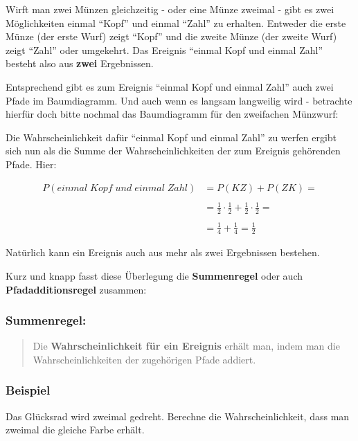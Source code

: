\documentclass[
  ngerman,
]{book}
\begin{document}
Wirft man zwei Münzen gleichzeitig - oder eine Münze zweimal - gibt es zwei Möglichkeiten einmal ``Kopf'' und einmal ``Zahl'' zu erhalten. Entweder die erste Münze (der erste Wurf) zeigt ``Kopf'' und die zweite Münze (der zweite Wurf) zeigt ``Zahl'' oder umgekehrt. Das Ereignis ``einmal Kopf und einmal Zahl'' besteht also aus \textbf{zwei} Ergebnissen.

Entsprechend gibt es zum Ereignis ``einmal Kopf und einmal Zahl'' auch zwei Pfade im Baumdiagramm. Und auch wenn es langsam langweilig wird - betrachte hierfür doch bitte nochmal das Baumdiagramm für den zweifachen Münzwurf:

Die Wahrscheinlichkeit dafür ``einmal Kopf und einmal Zahl'' zu werfen ergibt sich nun als die Summe der Wahrscheinlichkeiten der zum Ereignis gehörenden Pfade. Hier:

\[\begin{align} P(einmal\;Kopf\;und\;einmal\;Zahl) &= P(KZ) + P(ZK) =\\
{}\\
&= \frac{1}{2} \cdot \frac{1}{2} + \frac{1}{2} \cdot \frac{1}{2} =\\
{}\\
&= \frac{1}{4} + \frac{1}{4} = \frac{1}{2} \end{align}\]

Natürlich kann ein Ereignis auch aus mehr als zwei Ergebnissen bestehen.

Kurz und knapp fasst diese Überlegung die \textbf{Summenregel} oder auch \textbf{Pfadadditionsregel} zusammen:

\hypertarget{summenregel-1}{%
\subsubsection*{Summenregel:}\label{summenregel-1}}

\begin{quote}
Die \textbf{Wahrscheinlichkeit für ein Ereignis} erhält man, indem man die Wahrscheinlichkeiten der zugehörigen Pfade addiert.
\end{quote}

\hypertarget{beispiel-3}{%
\subsubsection*{Beispiel}\label{beispiel-3}}

Das Glücksrad wird zweimal gedreht. Berechne die Wahrscheinlichkeit, dass man zweimal die gleiche Farbe erhält.
\end{document}
